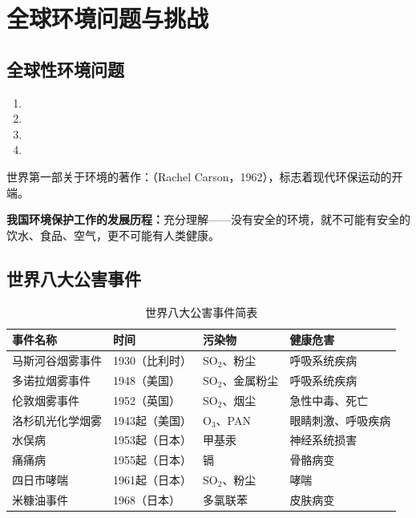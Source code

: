 \documentclass[10pt,a4paper,oneside]{ctexbook}
\begin{document}
\section{全球环境问题与挑战}

\subsection{全球性环境问题}
\begin{enumerate}[leftmargin=*]
    \item {}
    \item {}
    \item {}
    \item {}
\end{enumerate}

世界第一部关于环境的著作：（Rachel Carson，1962），标志着现代环保运动的开端。

\textbf{我国环境保护工作的发展历程：}充分理解——没有安全的环境，就不可能有安全的饮水、食品、空气，更不可能有人类健康。

\subsection{世界八大公害事件}

\begin{table}[htbp]
\centering
\caption{世界八大公害事件简表}
\begin{tabularx}{\textwidth}{lXXX}
\hline
\textbf{事件名称} & \textbf{时间} & \textbf{污染物} & \textbf{健康危害} \\
\hline
马斯河谷烟雾事件 & 1930（比利时） & SO$_2$、粉尘 & 呼吸系统疾病 \\
多诺拉烟雾事件 & 1948（美国） & SO$_2$、金属粉尘 & 呼吸系统疾病 \\
伦敦烟雾事件 & 1952（英国） & SO$_2$、烟尘 & 急性中毒、死亡 \\
洛杉矶光化学烟雾 & 1943起（美国） & O$_3$、PAN & 眼睛刺激、呼吸疾病 \\
水俣病 & 1953起（日本） & 甲基汞 & 神经系统损害 \\
痛痛病 & 1955起（日本） & 镉 & 骨骼病变 \\
四日市哮喘 & 1961起（日本） & SO$_2$、粉尘 & 哮喘 \\
米糠油事件 & 1968（日本） & 多氯联苯 & 皮肤病变 \\
\hline
\end{tabularx}
\end{table}
\end{document}
